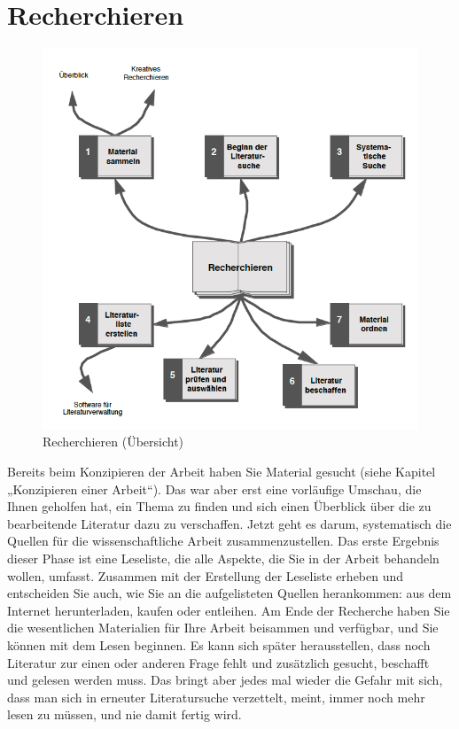 \documentclass[]{book}
\theoremstyle{definition}
\theoremstyle{definition}
\theoremstyle{definition}
\theoremstyle{remark}
\begin{document}
\chapter{Recherchieren}\label{recherchieren}

\begin{figure}

{\centering \includegraphics{images/recherchieren-min} 

}

\caption{Recherchieren (Übersicht)}\label{fig:unnamed-chunk-3}
\end{figure}

Bereits beim Konzipieren der Arbeit haben Sie Material gesucht (siehe
Kapitel „Konzipieren einer Arbeit``). Das war aber erst eine vorläufige
Umschau, die Ihnen geholfen hat, ein Thema zu finden und sich einen
Überblick über die zu bearbeitende Literatur dazu zu verschaffen. Jetzt
geht es darum, systematisch die Quellen für die wissenschaftliche Arbeit
zusammenzustellen. Das erste Ergebnis dieser Phase ist eine Leseliste,
die alle Aspekte, die Sie in der Arbeit behandeln wollen, umfasst.
Zusammen mit der Erstellung der Leseliste erheben und entscheiden Sie
auch, wie Sie an die aufgelisteten Quellen herankommen: aus dem Internet
herunterladen, kaufen oder entleihen. Am Ende der Recherche haben Sie
die wesentlichen Materialien für Ihre Arbeit beisammen und verfügbar,
und Sie können mit dem Lesen beginnen. Es kann sich später
herausstellen, dass noch Literatur zur einen oder anderen Frage fehlt
und zusätzlich gesucht, beschafft und gelesen werden muss. Das bringt
aber jedes mal wieder die Gefahr mit sich, dass man sich in erneuter
Literatursuche verzettelt, meint, immer noch mehr lesen zu müssen, und
nie damit fertig wird.
\end{document}
